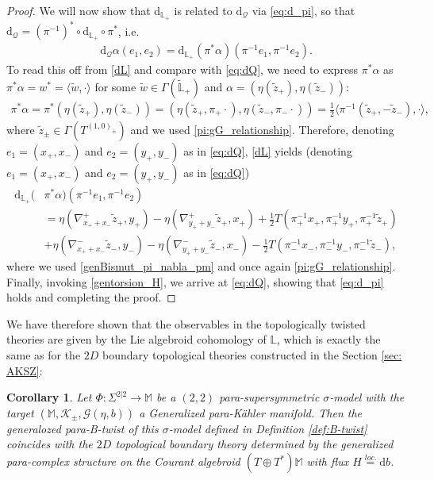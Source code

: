 \documentclass[letterpaper,12pt]{article}
\newcommand{\TT}{{T\oplus T^*}}
\newcommand{\KK}{\mathcal{K}}
\newcommand{\GG}{\mathcal{G}}
\newcommand{\QQ}{\mathcal{Q}}
\newcommand{\ap}{\alpha}
\newcommand{\n}{\nabla}
\newcommand{\rd}{\mathrm{d}}
\newcommand{\Lb}{\mathbb{L}}
\newcommand{\se}{\Gamma}
\newcommand{\la}{\langle}
\newcommand{\ra}{\rangle}
\newcommand{\zt}{\tl{z}}
\newcommand{\Mb}{\mathbb{M}}
\def\tl{\tilde}
\newtheorem{corollary}[theorem]{Corollary}
\theoremstyle{definition}
\theoremstyle{remark}
\theoremstyle{examples}
\begin{document}
\begin{proof}
We will now show that $\rd_{\Lb_+}$ is related to $\rd_\QQ$ via \eqref{eq:d_pi}, so that $\rd_\QQ=(\pi^{-1})^*\circ \rd_{\Lb_+}\circ \pi^*$, i.e.
\begin{align*}
\rd_\QQ\ap(e_1,e_2)=\rd_{\Lb_+}(\pi^*\ap)(\pi^{-1}e_1,\pi^{-1}e_2).
\end{align*}
To read this off from \eqref{dL} and compare with \eqref{eq:dQ}, we need to express $\pi^*\ap$ as $\pi^*\ap=w^*=\la \tl{w},\cdot\ra$ for some $\tl{w}\in\se (\tl{\Lb}_+)$ and $\ap=(\eta(\zt_+),\eta(\zt_-))$:
\begin{align*}
\pi^*\ap=\pi^*(\eta(\zt_+),\eta(\zt_-))=(\eta(\zt_+,\pi_+\cdot),\eta(\zt_-,\pi_-\cdot))=\frac{1}{2}\la\pi^{-1}(\zt_+,-\zt_-),\cdot\ra,
\end{align*}
where $\zt_\pm\in \se(T^{(1,0)_\pm})$ and we used \eqref{pi:gG_relationship}. Therefore, denoting $e_1=(x_+,x_-)$ and $e_2=(y_+,y_-)$ as in \eqref{eq:dQ}, \eqref{dL} yields (denoting $e_1=(x_+,x_-)$ and $e_2=(y_+,y_-)$ as in \eqref{eq:dQ})
\begin{align*}
\rd_{\Lb_+}(&\pi^*\ap)(\pi^{-1}e_1,\pi^{-1}e_2)\\
&=\eta(\n^+_{x_++x_-}\zt_+,y_+)-\eta(\n^+_{y_++y_-}\zt_+,x_+)+\frac{1}{2}T(\pi_+^{-1}x_+,\pi_+^{-1}y_+,\pi_+^{-1}\zt_+)\\
&+\eta(\n^-_{x_++x_-}\zt_-,y_-)-\eta(\n^-_{y_++y_-}\zt_-,x_-)-\frac{1}{2}T(\pi_-^{-1}x_-,\pi_-^{-1}y_-,\pi_-^{-1}\zt_-),
\end{align*}
where we used \eqref{genBismut_pi_nabla_pm} and once again \eqref{pi:gG_relationship}. Finally, invoking \eqref{gentorsion_H}, we arrive at \eqref{eq:dQ}, showing that \eqref{eq:d_pi} holds and completing the proof.
\end{proof}

We have therefore shown that the observables in the topologically twisted theories are given by the Lie algebroid cohomology of $\Lb$, which is exactly the same as for the $2D$ boundary topological theories constructed in the Section \ref{sec: AKSZ}:

\begin{corollary}
Let $\Phi:\Sigma^{2|2}\rightarrow \Mb$ be a $(2,2)$ para-supersymmetric $\sigma$-model with the target $(\Mb,\KK_\pm,\GG(\eta,b))$ a Generalized para-K\"ahler manifold. Then the generalozed para-B-twist of this $\sigma$-model defined in Definition \ref{def:B-twist} coincides with the $2D$ topological boundary theory determined by the generalized para-complex structure on the Courant algebroid $(\TT)\Mb$ with flux $H\overset{loc.}{=}\rd b$.
\end{corollary}
\end{document}
